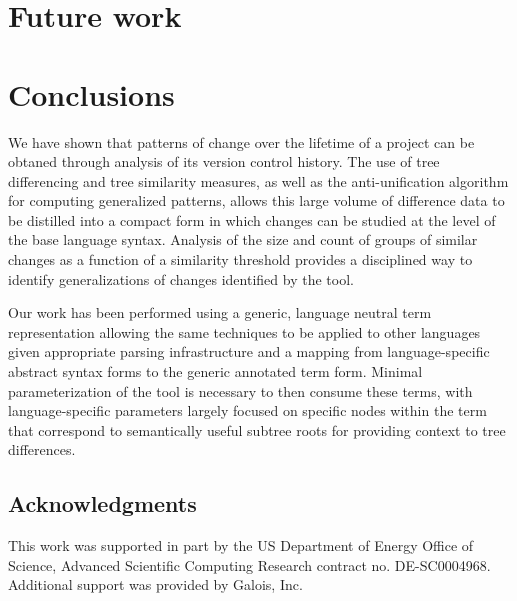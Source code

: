 \section{Future work}


\section{Conclusions}

We have shown that patterns of change over the lifetime of a project can be
obtaned through analysis of its version control history.  The use of tree
differencing and tree similarity measures, as well as the anti-unification
algorithm for computing generalized patterns, allows this large volume of
difference data to be distilled into a compact form in which changes can be
studied at the level of the base language syntax.  Analysis of the size and
count of groups of similar changes as a function of a similarity threshold
provides a disciplined way to identify generalizations of changes identified by
the tool.

Our work has been performed using a generic, language neutral term
representation allowing the same techniques to be applied to other languages
given appropriate parsing infrastructure and a mapping from language-specific
abstract syntax forms to the generic annotated term form.  Minimal
parameterization of the tool is necessary to then consume these terms, with
language-specific parameters largely focused on specific nodes within the term
that correspond to semantically useful subtree roots for providing context to
tree differences.




\subsection{Acknowledgments}

This work was supported in part by the US Department of
Energy Office of Science, Advanced Scientific Computing Research
contract no. DE-SC0004968.  Additional support was provided by Galois,
Inc.
